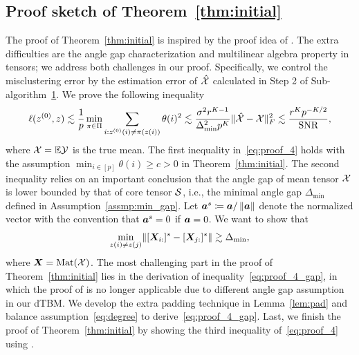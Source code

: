 \documentclass[lettersize,onecolumn,journal]{IEEEtran}
\theoremstyle{definition}
\theoremstyle{definition}
\begin{document}
\subsection{Proof sketch of Theorem~\ref{thm:initial}}
The proof of Theorem~\ref{thm:initial} is inspired by the proof idea of \citet[Lemma 1]{gao2018community}. The extra difficulties are the angle gap characterization and multilinear algebra property in tensors; we address both challenges in our proof. Specifically, we control the misclustering error by the estimation error of $\hat {\mathcal{X}}$ calculated in Step 2 of Sub-algorithm~\hyperref[alg:main]{1}.  We prove the following inequality
\begin{equation}\label{eq:proof_4}
    \ell(z^{(0)},z) \lesssim \frac{1}{p}\min_{\pi \in \Pi} \sum_{i: z^{(0)}(i) \neq \pi(z(i))} \theta(i)^2 \lesssim \frac{\sigma^2 r^{K-1}}{ \Delta_{\min}^2 p^K} \onormSize{}{\hat \tX - \tX}_F^2 \lesssim \frac{r^K p^{-K/2}}{\text{SNR}},
\end{equation}
where $\mathcal{X} = \mathbb{E} \mathcal{Y}$ is the true mean. The first inequality in~\eqref{eq:proof_4} holds with the assumption $\min_{i \in [p]} \theta(i) \geq c>0$ in Theorem~\ref{thm:initial}. The second inequality relies on an important conclusion that the angle gap of mean tensor $\mathcal{X}$ is lower bounded by that of core tensor $\mathcal{S}$, i.e., the minimal angle gap $\Delta_{\min}$ defined in Assumption~\ref{assmp:min_gap}. Let $\bm{a}^{s} \coloneqq \bm{a}/\left\lVert\bm{a}\right\rVert$ denote the normalized vector with the convention that $\bm{a}^s = 0$ if $\bm{a} = 0$. We want to show that
\begin{equation}\label{eq:proof_4_gap}
\min_{z(i) \neq z(j)} \onormSize{}{[\mX_{i:}]^s - [\mX_{j:}]^s} \gtrsim \Delta_{\min},
\end{equation}
where $\bm X = \text{Mat}(\mathcal{X})$. The most challenging part in the proof of Theorem~\ref{thm:initial} lies in the derivation of inequality~\eqref{eq:proof_4_gap}, in which the proof of \cite{gao2018community} is no longer applicable due to different angle gap assumption in our dTBM. We develop the extra padding technique in Lemma~\ref{lem:pad} and balance assumption~\eqref{eq:degree} to derive~\eqref{eq:proof_4_gap}. Last, we finish the proof of Theorem~\ref{thm:initial} by showing the third inequality of~\eqref{eq:proof_4} using \citet[Proposition 1]{han2020exact}. 
\end{document}

